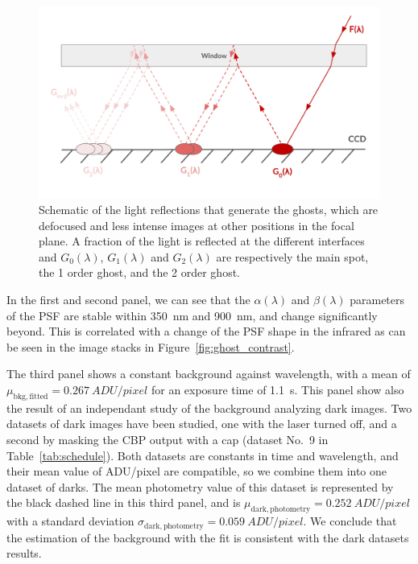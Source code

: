 \begin{figure}[h]
    \centering
    \includegraphics[width=\columnwidth]{fig/schema_ghost.pdf}
    \caption{Schematic of the light reflections that generate the ghosts, which are defocused and less intense images at other positions in the focal plane. A fraction of the light is reflected at the different interfaces and $G_0(\lambda)$, $G_1(\lambda)$ and $G_2(\lambda)$ are respectively the main spot, the 1 order ghost, and the 2 order ghost.}
    \label{fig:schema_ghost}
\end{figure}

In the first and second panel, we can see that the $\alpha(\lambda)$ and $\beta(\lambda)$ parameters of the PSF are stable within \SI{350}{\nano\meter} and \SI{900}{\nano\meter}, and change significantly beyond. This is correlated with a change of the PSF shape in the infrared as can be seen in the image stacks in Figure~\ref{fig:ghost_contrast}. 

The third panel shows a constant background against wavelength, with a mean of $\mu_\mathrm{bkg, fitted}=\SI{0.267}{ADU/pixel}$ for an exposure time of \SI{1.1}{\second}. This panel show also the result of an independant study of the background analyzing dark images. Two datasets of dark images have been studied, one with the laser turned off, and a second by masking the CBP output with a cap (dataset No.~9 in Table~\ref{tab:schedule}). Both datasets are constants in time and wavelength, and their mean value of ADU/pixel are compatible, so we combine them into one dataset of darks. The mean photometry value of this dataset is represented by the black dashed line in this third panel, and is $\mu_\mathrm{dark, photometry}=\SI{0.252}{ADU/pixel}$ with a standard deviation $\sigma_\mathrm{dark, photometry}=\SI{0.059}{ADU/pixel}$. We conclude that the estimation of the background with the fit is consistent with the dark datasets results. \\

